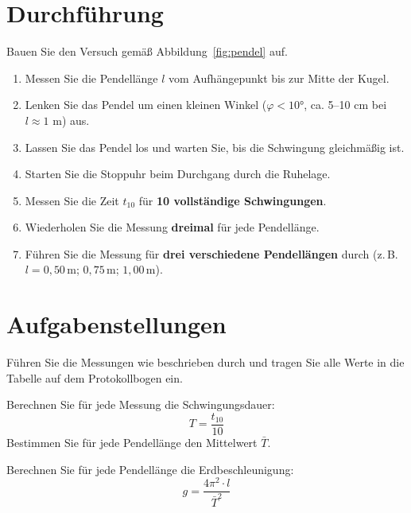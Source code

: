 \documentclass[11pt,a4paper]{scrartcl}
\begin{document}
	\section*{Durchführung}
	
	Bauen Sie den Versuch gemäß Abbildung~\ref{fig:pendel} auf.
	
	\begin{enumerate}
		\item Messen Sie die Pendellänge $l$ vom Aufhängepunkt bis zur Mitte der Kugel.
		\item Lenken Sie das Pendel um einen kleinen Winkel ($\varphi < 10°$, ca. 5--10 cm bei $l \approx 1$ m) aus.
		\item Lassen Sie das Pendel los und warten Sie, bis die Schwingung gleichmäßig ist.
		\item Starten Sie die Stoppuhr beim Durchgang durch die Ruhelage.
		\item Messen Sie die Zeit $t_{10}$ für \textbf{10 vollständige Schwingungen}.
		\item Wiederholen Sie die Messung \textbf{dreimal} für jede Pendellänge.
		\item Führen Sie die Messung für \textbf{drei verschiedene Pendellängen} durch (z.\,B. $l = 0{,}50\,\text{m}$; $0{,}75\,\text{m}$; $1{,}00\,\text{m}$).
	\end{enumerate}
	
	\section*{Aufgabenstellungen}
	
	\begin{aufgabe}[title={\faIcon{pencil-alt} Aufgabe 1: Messungen durchführen}]
		Führen Sie die Messungen wie beschrieben durch und tragen Sie alle Werte in die Tabelle auf dem Protokollbogen ein.
	\end{aufgabe}
	
	\begin{aufgabe}[title={\faIcon{pencil-alt} Aufgabe 2: Schwingungsdauer berechnen}]
		Berechnen Sie für jede Messung die Schwingungsdauer:
		\[T = \frac{t_{10}}{10}\]
		Bestimmen Sie für jede Pendellänge den Mittelwert $\bar{T}$.
	\end{aufgabe}
	
	\begin{aufgabe}[title={\faIcon{pencil-alt} Aufgabe 3: Erdbeschleunigung berechnen}]
		Berechnen Sie für jede Pendellänge die Erdbeschleunigung:
		\[g = \frac{4\pi^2 \cdot l}{\bar{T}^2}\]
	\end{aufgabe}
	
\end{document}
